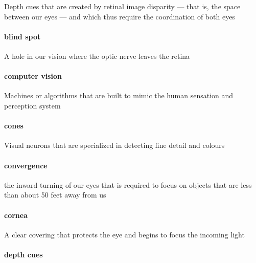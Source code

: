 \documentclass[
]{krantz}
\begin{document}
Depth cues that are created by retinal image disparity --- that is, the space between our eyes --- and which thus require the coordination of both eyes

\hypertarget{blind-spot}{%
\paragraph*{blind spot}\label{blind-spot}}

A hole in our vision where the optic nerve leaves the retina

\hypertarget{computer-vision}{%
\paragraph*{computer vision}\label{computer-vision}}

Machines or algorithms that are built to mimic the human sensation and perception system

\hypertarget{cones}{%
\paragraph*{cones}\label{cones}}

Visual neurons that are specialized in detecting fine detail and colours

\hypertarget{convergence}{%
\paragraph*{convergence}\label{convergence}}

the inward turning of our eyes that is required to focus on objects that are less than about 50 feet away from us

\hypertarget{cornea}{%
\paragraph*{cornea}\label{cornea}}

A clear covering that protects the eye and begins to focus the incoming light

\hypertarget{depth-cues}{%
\paragraph*{depth cues}\label{depth-cues}}
\end{document}
